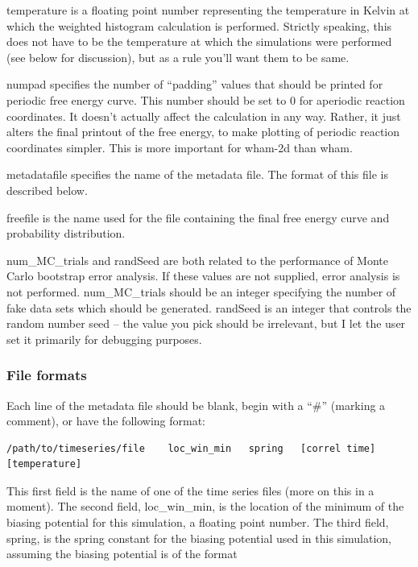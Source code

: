 \documentclass[12pt]{article}
\begin{document}
temperature is a floating point number representing the temperature in Kelvin at
which the weighted histogram calculation is performed.  Strictly speaking, this
does not have to be the temperature at which the simulations were performed (see
below for discussion), but as a rule you'll want them to be same.

numpad specifies the number of ``padding'' values that should be printed for
periodic free energy curve.  This number should be set to 0 for aperiodic
reaction coordinates.  It doesn't actually affect the calculation in any way.
Rather, it just alters the final printout of the free energy, to make plotting
of periodic reaction coordinates simpler.  This is more important for wham-2d
than wham.

metadatafile specifies the name of the metadata file.  The format of this
file is described below.

freefile is the name used for the file containing the final free energy curve
and probability distribution.

num\_MC\_trials and randSeed are both related to the performance of Monte
Carlo bootstrap error analysis.  If these values are not supplied, error
analysis is not performed.  num\_MC\_trials should be an integer specifying
the number of fake data sets which should be generated.  randSeed is an
integer that controls the random number seed -- the value you pick should
be irrelevant, but I let the user set it primarily for debugging purposes.

\subsubsection{File formats}
\label{ss:format}

Each line of the metadata file should be blank, begin with a ``\#'' (marking a
comment), or have the following format:

\begin{footnotesize}
\begin{verbatim}
/path/to/timeseries/file    loc_win_min   spring   [correl time] [temperature]
\end{verbatim}
\end{footnotesize}

This first field is the name of one of the time series files (more on this
in a moment).  The second field, loc\_win\_min, is the location of the
minimum of the biasing potential for this simulation, a floating point
number.  The third field, spring, is the spring constant for the biasing
potential used in this simulation, assuming the biasing potential is of the
format
\end{document}

